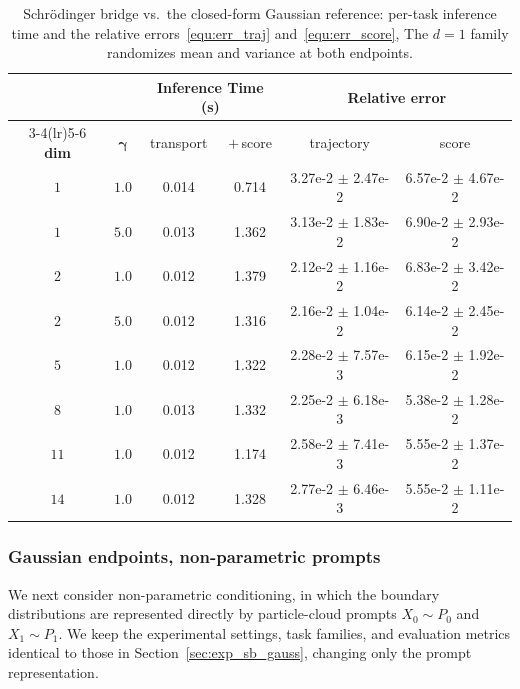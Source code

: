 \documentclass[preprint]{elsarticle}
\newcommand{\g}{\gamma}
\begin{document}
\begin{table}[!htpb]
    \centering
    \caption{Schr\"odinger bridge vs.\ the closed-form Gaussian reference:
    per-task inference time and the relative errors~\eqref{equ:err_traj}
    and~\eqref{equ:err_score}, The $d=1$ family randomizes mean and
    variance at both endpoints.
    }
    \label{tab:sb_error_comparison}
    \begin{tabular}{cccccc}
        \toprule
         & & \multicolumn{2}{c}{\textbf{Inference Time (s)}}
            & \multicolumn{2}{c}{\textbf{Relative error}} \\
        \cmidrule(lr){3-4}\cmidrule(lr){5-6}
        \textbf{dim} & $\boldsymbol{\g}$ & transport & $+$\,score
            & trajectory & score \\
        \midrule
        $1$ & $1.0$ & 0.014 & 0.714 & 3.27e-2 $\pm$ 2.47e-2 & 6.57e-2 $\pm$ 4.67e-2 \\
        $1$ & $5.0$ & 0.013 & 1.362 & 3.13e-2 $\pm$ 1.83e-2 & 6.90e-2 $\pm$ 2.93e-2 \\
        \midrule
        $2$ & $1.0$ & 0.012 & 1.379 & 2.12e-2 $\pm$ 1.16e-2 & 6.83e-2 $\pm$ 3.42e-2 \\
        $2$ & $5.0$ & 0.012 & 1.316 & 2.16e-2 $\pm$ 1.04e-2 & 6.14e-2 $\pm$ 2.45e-2 \\
        \midrule
        $5$ & $1.0$ & 0.012 & 1.322 & 2.28e-2 $\pm$ 7.57e-3 & 6.15e-2 $\pm$ 1.92e-2 \\
        $8$ & $1.0$ & 0.013 & 1.332 & 2.25e-2 $\pm$ 6.18e-3 & 5.38e-2 $\pm$ 1.28e-2 \\
        $11$ & $1.0$ & 0.012 & 1.174 & 2.58e-2 $\pm$ 7.41e-3 & 5.55e-2 $\pm$ 1.37e-2 \\
        $14$ & $1.0$ & 0.012 & 1.328 & 2.77e-2 $\pm$ 6.46e-3 & 5.55e-2 $\pm$ 1.11e-2 \\
        \bottomrule
    \end{tabular}
\end{table}

\subsubsection{Gaussian endpoints, non-parametric prompts}
\label{sec:exp_nonparam_sb}
We next consider non-parametric conditioning, in which the boundary distributions are represented directly by particle-cloud prompts $X_0\sim P_0$ and $X_1\sim P_1$. We keep the experimental settings, task families, and evaluation metrics identical to those in Section~\ref{sec:exp_sb_gauss}, changing only the prompt representation.
\end{document}
